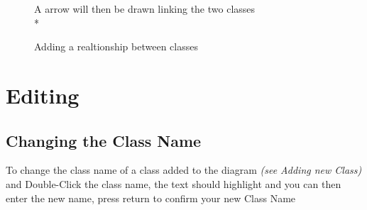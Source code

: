\documentclass[a4paper]{article}
\begin{document}
{\begin{figure}[H]
\begin{center}
\end{center}
A arrow will then be drawn linking the two classes\\*
\begin{center}
\caption{Adding a realtionship between classes}
\end{center}
\end{figure}


\section{Editing}
\subsection{Changing the Class Name}
To change the class name of a class added to the diagram \emph{(see Adding new Class)} and Double-Click the class name, the text should highlight and you can then enter the new name, press return to confirm your new Class Name

}
\end{document}
